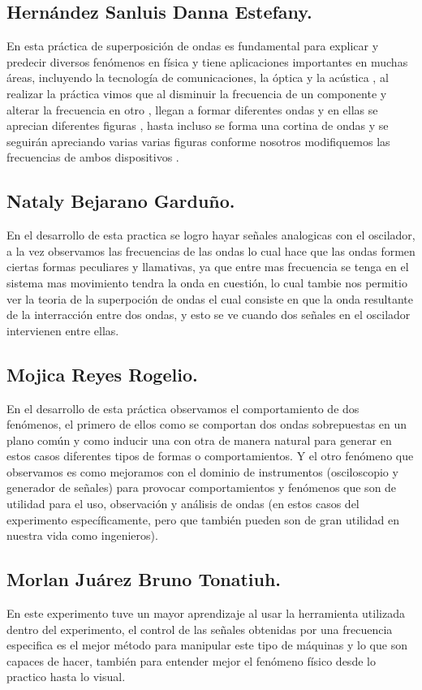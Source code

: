 \documentclass[10pt]{article}
\begin{document}
\begin{multicols}{2}
\subsection{Hernández Sanluis Danna Estefany.}
En esta práctica de superposición de ondas es fundamental para explicar y predecir diversos fenómenos en física y tiene aplicaciones importantes en muchas áreas, incluyendo la tecnología de comunicaciones, la óptica y la acústica , al realizar la práctica vimos que al disminuir la frecuencia de un componente y alterar la frecuencia en otro , llegan a formar diferentes ondas y en ellas se aprecian diferentes figuras , hasta incluso se forma una cortina de ondas y se seguirán apreciando varias varias figuras conforme nosotros modifiquemos las frecuencias de ambos dispositivos .
\subsection{Nataly Bejarano Garduño.}
En el desarrollo de esta practica se logro hayar señales analogicas con el oscilador, a la vez observamos las frecuencias de las ondas lo cual hace que las ondas formen ciertas formas peculiares y llamativas, ya que entre mas frecuencia se tenga en el sistema mas movimiento tendra la onda en cuestión, lo cual tambie nos permitio ver la teoria de la superpoción de ondas el cual consiste en que la onda resultante de la interracción entre dos ondas, y esto se ve cuando dos señales en el oscilador intervienen entre ellas.
\subsection{Mojica Reyes Rogelio.}
En el desarrollo de esta práctica observamos el comportamiento de dos fenómenos, el primero de ellos como se comportan dos ondas sobrepuestas en un plano común y como inducir una con otra de manera natural para generar en estos casos diferentes tipos de formas o comportamientos. Y el otro fenómeno que observamos es como mejoramos con el dominio de instrumentos (osciloscopio y generador de señales) para provocar comportamientos y fenómenos que son de utilidad para el uso, observación y análisis de ondas (en estos casos del experimento específicamente, pero que también pueden son de gran utilidad en nuestra vida como ingenieros).
\subsection*{Morlan Juárez Bruno Tonatiuh.}
En este experimento tuve un mayor aprendizaje al usar la herramienta utilizada dentro del experimento, el control de las señales obtenidas por una frecuencia especifica es el mejor método para manipular este tipo de máquinas y lo que son capaces de hacer, también para entender mejor el fenómeno físico desde lo practico hasta lo visual. 

\end{multicols}
\end{document}
